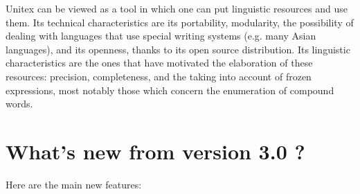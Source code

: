 \bigskip
\noindent Unitex can be viewed as a tool in which one can put linguistic resources
and use them. Its technical characteristics are its portability,  modularity,
the possibility of dealing with languages that use special writing systems (e.g. many
Asian languages), and its openness, thanks to its open source distribution. Its
linguistic characteristics are the ones that have motivated the elaboration of
these resources: precision, completeness, and the taking into account of frozen
expressions, most notably those which concern the enumeration of compound words.


\section*{What's new from version 3.0 ?}
Here are the main new features:
